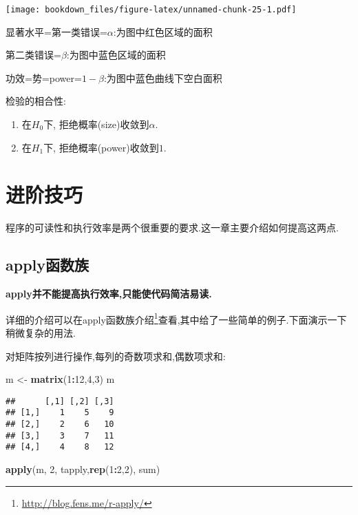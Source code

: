 \documentclass[]{ctexbook}
\newenvironment{Shaded}{\begin{snugshade}}{\end{snugshade}}
\newcommand{\DecValTok}[1]{\textcolor[rgb]{0.00,0.00,0.81}{#1}}
\newcommand{\KeywordTok}[1]{\textcolor[rgb]{0.13,0.29,0.53}{\textbf{#1}}}
\newcommand{\NormalTok}[1]{#1}
\newcommand{\OperatorTok}[1]{\textcolor[rgb]{0.81,0.36,0.00}{\textbf{#1}}}
\newcommand{\StringTok}[1]{\textcolor[rgb]{0.31,0.60,0.02}{#1}}
\providecommand{\tightlist}{%
  \setlength{\itemsep}{0pt}\setlength{\parskip}{0pt}}
\renewcommand{\href}[2]{#2\footnote{\url{#1}}}
\begin{document}
\texttt{[image: bookdown\_files/figure-latex/unnamed-chunk-25-1.pdf]}

显著水平=第一类错误=\(\alpha\):为图中红色区域的面积

第二类错误=\(\beta\):为图中蓝色区域的面积

功效=势=power=\(1- \beta\):为图中蓝色曲线下空白面积

检验的相合性:

\begin{enumerate}
\def\labelenumi{\arabic{enumi}.}
\tightlist
\item
  在\(H_0\)下, 拒绝概率(size)收敛到\(\alpha.\)
\item
  在\(H_1\)下, 拒绝概率(power)收敛到\(1.\)
\end{enumerate}

\hypertarget{section-11}{%
\chapter{进阶技巧}\label{section-11}}

程序的可读性和执行效率是两个很重要的要求.这一章主要介绍如何提高这两点.

\hypertarget{apply}{%
\section{apply函数族}\label{apply}}

\textbf{apply并不能提高执行效率,只能使代码简洁易读.}

详细的介绍可以在\href{http://blog.fens.me/r-apply/}{apply函数族介绍}查看,其中给了一些简单的例子.下面演示一下稍微复杂的用法.

对矩阵按列进行操作,每列的奇数项求和,偶数项求和:

\begin{Shaded}
\begin{Highlighting}[]
\NormalTok{m <-}\StringTok{ }\KeywordTok{matrix}\NormalTok{(}\DecValTok{1}\OperatorTok{:}\DecValTok{12}\NormalTok{,}\DecValTok{4}\NormalTok{,}\DecValTok{3}\NormalTok{)}
\NormalTok{m}
\end{Highlighting}
\end{Shaded}

\begin{verbatim}
##      [,1] [,2] [,3]
## [1,]    1    5    9
## [2,]    2    6   10
## [3,]    3    7   11
## [4,]    4    8   12
\end{verbatim}

\begin{Shaded}
\begin{Highlighting}[]
\KeywordTok{apply}\NormalTok{(m, }\DecValTok{2}\NormalTok{, tapply,}\KeywordTok{rep}\NormalTok{(}\DecValTok{1}\OperatorTok{:}\DecValTok{2}\NormalTok{,}\DecValTok{2}\NormalTok{), sum)}
\end{Highlighting}
\end{Shaded}
\end{document}
